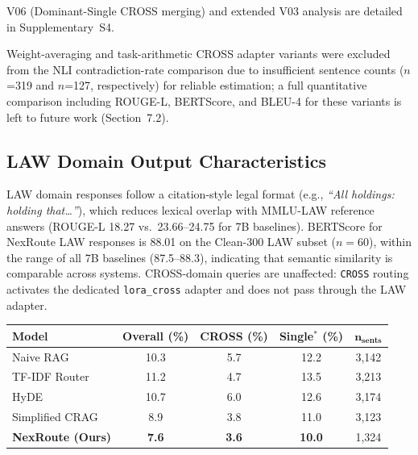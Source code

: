 \documentclass[a4paper,fleql,doubleblind]{cas-sc}
\begin{document}
V06 (Dominant-Single CROSS merging) and extended V03 analysis are detailed
in Supplementary~S4.

Weight-averaging and task-arithmetic CROSS adapter variants were excluded from the NLI contradiction-rate comparison due to insufficient sentence counts ($n$=319 and $n$=127, respectively) for reliable estimation; a full quantitative comparison including ROUGE-L, BERTScore, and BLEU-4 for these variants is left to future work (Section~7.2).

\subsection{LAW Domain Output Characteristics}
\label{ssec:law-characteristics}

LAW domain responses follow a citation-style legal format
(e.g., \textit{``All holdings: holding that\ldots''}), which reduces lexical overlap
with MMLU-LAW reference answers (ROUGE-L 18.27 vs.\ 23.66--24.75 for 7B baselines).
BERTScore for NexRoute LAW responses is 88.01 on the Clean-300 LAW subset ($n{=}60$),
within the range of all 7B baselines (87.5--88.3), indicating that semantic similarity
is comparable across systems.
CROSS-domain queries are unaffected: \texttt{CROSS} routing activates the dedicated
\texttt{lora\_cross} adapter and does not pass through the LAW adapter.

\vspace{4pt}
\begin{center}
\begingroup
{}
\label{tab:hallucination-excl-law}
\begin{tabular}{lcccc}
\toprule
\textbf{Model} & \textbf{Overall (\%)} & \textbf{CROSS (\%)} & \textbf{Single$^{*}$ (\%)} & $\boldsymbol{n_{\text{sents}}}$ \\
\midrule
Naive RAG              & 10.3 & 5.7 & 12.2 & 3{,}142 \\
TF-IDF Router          & 11.2 & 4.7 & 13.5 & 3{,}213 \\
HyDE                   & 10.7 & 6.0 & 12.6 & 3{,}174 \\
Simplified CRAG        &  8.9 & 3.8 & 11.0 & 3{,}123 \\
\textbf{NexRoute (Ours)} & \textbf{7.6} & \textbf{3.6} & \textbf{10.0} & 1{,}324 \\
\bottomrule
\end{tabular}
\endgroup
\end{center}
\vspace{4pt}
\end{document}
